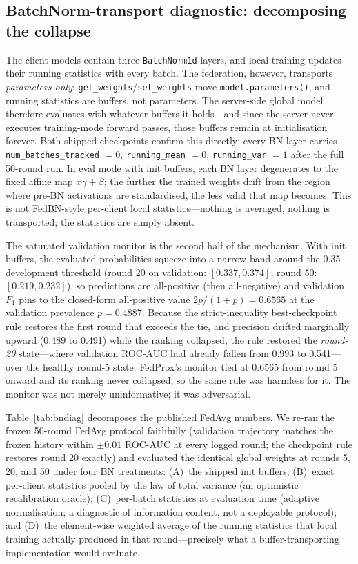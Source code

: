 \subsection{BatchNorm-transport diagnostic: decomposing the collapse}
\label{sec:res-bn}

The client models contain three \texttt{BatchNorm1d} layers, and local
training updates their running statistics with every batch. The
federation, however, transports \emph{parameters only}:
\texttt{get\_weights}/\texttt{set\_weights} move
\texttt{model.parameters()}, and running statistics are buffers, not
parameters. The server-side global model therefore evaluates with
whatever buffers it holds---and since the server never executes
training-mode forward passes, those buffers remain at initialisation
forever. Both shipped checkpoints confirm this directly: every BN layer
carries \texttt{num\_batches\_tracked} $= 0$, \texttt{running\_mean}
$= 0$, \texttt{running\_var} $= 1$ after the full 50-round run. In
eval mode with init buffers, each BN layer degenerates to the fixed
affine map $x \gamma + \beta$; the further the trained weights drift
from the region where pre-BN activations are standardised, the less
valid that map becomes. This is not FedBN-style per-client local statistics---nothing is
averaged, nothing is transported; the statistics are simply absent.

The saturated validation monitor is the second half of the mechanism.
With init buffers, the evaluated probabilities squeeze into a narrow
band around the 0.35 development threshold (round 20 on validation:
$[0.337, 0.374]$; round 50: $[0.219, 0.232]$), so predictions are
all-positive (then all-negative) and validation $F_1$ pins to the
closed-form all-positive value $2p/(1{+}p) = 0.6565$ at the validation
prevalence $p = 0.4887$. Because the strict-inequality best-checkpoint
rule restores the first round that exceeds the tie, and precision
drifted marginally upward (0.489 to 0.491) while the ranking collapsed,
the rule restored the \emph{round-20} state---where validation ROC-AUC
had already fallen from 0.993 to 0.541---over the healthy round-5
state. FedProx's monitor tied at 0.6565 from round 5 onward and its
ranking never collapsed, so the same rule was harmless for it. The
monitor was not merely uninformative; it was adversarial.

Table~\ref{tab:bndiag} decomposes the published FedAvg numbers. We
re-ran the frozen 50-round FedAvg protocol faithfully (validation
trajectory matches the frozen history within $\pm 0.01$ ROC-AUC at
every logged round; the checkpoint rule restores round 20 exactly) and
evaluated the identical global weights at rounds 5, 20, and 50 under
four BN treatments: (A)~the shipped init buffers; (B)~exact per-client
statistics pooled by the law of total variance (an optimistic
recalibration oracle); (C)~per-batch statistics at evaluation time
(adaptive normalisation; a diagnostic of information content, not a
deployable protocol); and (D)~the element-wise weighted average of the
running statistics that local training actually produced in that
round---precisely what a buffer-transporting implementation would
evaluate.

